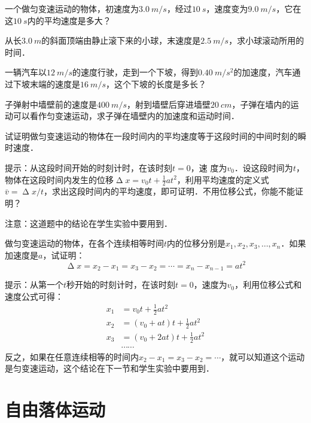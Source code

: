 \begin{Exercise}
	\begin{QsNum}
	    \item 一个做匀变速运动的物体，初速度为$\qty{3.0}{m/s}$，经过$\qty{10}{s}$，速度变为$\qty{9.0}{m/s}$，它在这$\qty{10}{s}$内的平均速度是多大？
	    \item 从长$\qty{3.0}{m}$的斜面顶端由静止滚下来的小球，末速度是$\qty{2.5}{m/s}$，求小球滚动所用的时间．
	    \item 一辆汽车以$\qty{12}{m/s}$的速度行驶，走到一个下坡，得到$\qty{0.40}{m/s^2}$的加速度，汽车通过下坡末端的速度是$\qty{16}{m/s}$，这个下坡的长度是多长？
	    \item 子弹射中墙壁前的速度是$\qty{400}{m/s}$，射到墙壁后穿进墙壁$\qty{20}{cm}$，子弹在墙内的运动可以看作匀变速运动，求子弹在墙壁内的加速度和运动时间．
	    \item 试证明做匀变速运动的物体在一段时间内的平均速度等于这段时间的中间时刻的瞬时速度．
	
	          提示：从这段时间开始的时刻计时，在该时刻$t=0$，速
	          度为$v_0$．设这段时间为$t$，物体在这段时间内发生的位移$\upDelta x=v_0t +\frac{1}{2}at^2$，利用平均速度的定义式$\bar v=\upDelta x/t$，求出这段时间内的平均速度，即可证明．不用位移公式，你能不能证明？
	
	          注意：这道题中的结论在学生实验中要用到．
	
	    \item 做匀变速运动的物体，在各个连续相等时间$t$内的位移分别是$x_1, x_2, x_3,\ldots,x_n$．如果加速度是$a$，试证明：
	          \[\upDelta x=x_2-x_1=x_3-x_2=\cdots=x_n-x_{n-1}=at^2 \]
	
	          提示：从第一个$t$秒开始的时刻计时，在该时刻$t=0$，速度为$v_0$，利用位移公式和速度公式可得：
	          \[\begin{split}
	                  x_1 & =v_0t +\frac{1}{2}at^2       \\
	                  x_2 & =(v_0+at)t +\frac{1}{2}at^2  \\
	                  x_3 & =(v_0+2at)t +\frac{1}{2}at^2 \\
	                      & \cdots\cdots
	              \end{split} \]
	          反之，如果在任意连续相等的时间内$x_2-x_1=x_3-x_2=\cdots$，就可以知道这个运动是匀变速运动，这个结论在下一节和学生实验中要用到．
	\end{QsNum}
\end{Exercise}


\section{自由落体运动}
